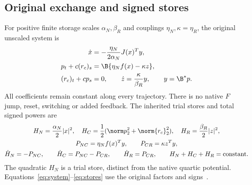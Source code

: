 \subsection{Original exchange and signed stores}
For positive finite storage scales $\alpha_N,\beta_R$ and couplings $\eta_N,\kappa=\eta_R$, the original unscaled system is
\begin{equation}\label{eq:system}%
\begin{aligned}
\dot x&=-\frac{\eta_N}{2\alpha_N}J(x)^Ty,\\
p_t+c(r_c)_s&=\B\{\eta_Nf(x)-\kappa z\},\\
(r_c)_t+cp_s&=0,\qquad
\dot z=\frac{\kappa}{\beta_R}y,\qquad y=\B^*p.
\end{aligned}
\end{equation}
All coefficients remain constant along every trajectory. There is no native $F$ jump, reset, switching or added feedback. The inherited trial stores and total signed powers are
\begin{equation}\label{eq:stores}%
\begin{gathered}
H_N=\frac{\alpha_N}{2}|x|^2,\quad
H_C=\frac12(\norm p_2^2+\norm{r_c}_2^2),\quad
H_R=\frac{\beta_R}{2}|z|^2,\\
P_{NC}=\eta_N f(x)^Ty,\qquad P_{CR}=\kappa z^Ty,\\
\dot H_N=-P_{NC},\qquad \dot H_C=P_{NC}-P_{CR},\qquad
\dot H_R=P_{CR},\qquad H_N+H_C+H_R=\text{constant}.
\end{gathered}
\end{equation}
The quadratic $H_N$ is a trial store, distinct from the native quartic potential. Equations~\eqref{eq:system}--\eqref{eq:stores} use the original factors and signs~\cite[Section 2.2, (2.3)--(2.4)]{p3}.

